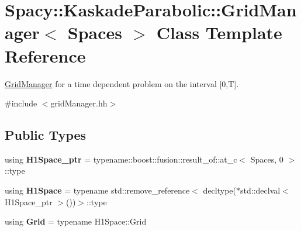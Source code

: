 \hypertarget{classSpacy_1_1KaskadeParabolic_1_1GridManager}{\section{Spacy\-:\-:Kaskade\-Parabolic\-:\-:Grid\-Manager$<$ Spaces $>$ Class Template Reference}
\label{classSpacy_1_1KaskadeParabolic_1_1GridManager}
}


\hyperlink{classSpacy_1_1KaskadeParabolic_1_1GridManager}{Grid\-Manager} for a time dependent problem on the interval \mbox{[}0,T\mbox{]}.  




{\ttfamily \#include $<$grid\-Manager.\-hh$>$}

\subsection*{Public Types}
\begin{DoxyCompactItemize}
\item 
\hypertarget{classSpacy_1_1KaskadeParabolic_1_1GridManager_a38aed766df3a6563a7683cd58adbd76b}{using {\bfseries H1\-Space\-\_\-ptr} = typename\-::boost\-::fusion\-::result\-\_\-of\-::at\-\_\-c$<$ Spaces, 0 $>$\-::type}\label{classSpacy_1_1KaskadeParabolic_1_1GridManager_a38aed766df3a6563a7683cd58adbd76b}

\item 
\hypertarget{classSpacy_1_1KaskadeParabolic_1_1GridManager_ae91d41e3c1ff0c46ca648d3eb7c7ae36}{using {\bfseries H1\-Space} = typename std\-::remove\-\_\-reference$<$ decltype($\ast$std\-::declval$<$ H1\-Space\-\_\-ptr $>$())$>$\-::type}\label{classSpacy_1_1KaskadeParabolic_1_1GridManager_ae91d41e3c1ff0c46ca648d3eb7c7ae36}

\item 
\hypertarget{classSpacy_1_1KaskadeParabolic_1_1GridManager_a3b3cca79572b2f8781545934fab38369}{using {\bfseries Grid} = typename H1\-Space\-::\-Grid}\label{classSpacy_1_1KaskadeParabolic_1_1GridManager_a3b3cca79572b2f8781545934fab38369}

\end{DoxyCompactItemize}
